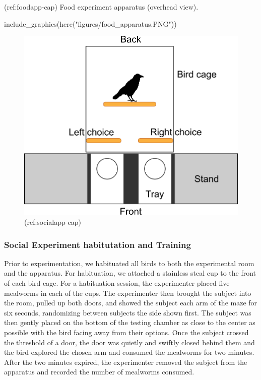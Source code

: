 \documentclass[
]{article}
\newenvironment{Shaded}{\begin{snugshade}}{\end{snugshade}}
\newcommand{\FunctionTok}[1]{\textcolor[rgb]{0.00,0.00,0.00}{#1}}
\newcommand{\NormalTok}[1]{#1}
\newcommand{\StringTok}[1]{\textcolor[rgb]{0.31,0.60,0.02}{#1}}
\begin{document}
(ref:foodapp-cap) Food experiment apparatus (overhead view).

\begin{Shaded}
\begin{Highlighting}[]
\FunctionTok{include\_graphics}\NormalTok{(}\FunctionTok{here}\NormalTok{(}\StringTok{"figures/food\_apparatus.PNG"}\NormalTok{))}
\end{Highlighting}
\end{Shaded}

\begin{figure}

{\centering \includegraphics[width=1\linewidth]{../figures/food_apparatus} 

}

\caption{(ref:socialapp-cap)}\label{fig:foodapp}
\end{figure}

\hypertarget{social-experiment-habitutation-and-training}{%
\subsubsection{Social Experiment habitutation and
Training}\label{social-experiment-habitutation-and-training}}

Prior to experimentation, we habituated all birds to both the
experimental room and the apparatus. For habituation, we attached a
stainless steal cup to the front of each bird cage. For a habituation
session, the experimenter placed five mealworms in each of the cups. The
experimenter then brought the subject into the room, pulled up both
doors, and showed the subject each arm of the maze for six seconds,
randomizing between subjects the side shown first. The subject was then
gently placed on the bottom of the testing chamber as close to the
center as possible with the bird facing away from their options. Once
the subject crossed the threshold of a door, the door was quietly and
swiftly closed behind them and the bird explored the chosen arm and
consumed the mealworms for two minutes. After the two minutes expired,
the experimenter removed the subject from the apparatus and recorded the
number of mealworms consumed.
\end{document}
